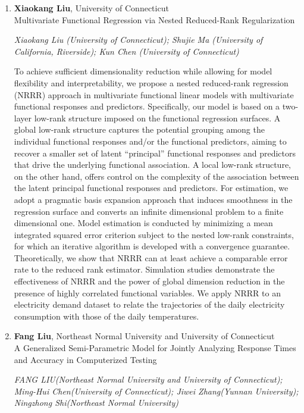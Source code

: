 \begin{enumerate}
\item \textbf{Xiaokang Liu}, University of Connecticut \\
Multivariate Functional Regression via Nested Reduced-Rank Regularization

\emph{\footnotesize Xiaokang Liu (University of Connecticut); Shujie Ma (University of California, Riverside); Kun Chen (University of Connecticut)}

To achieve sufficient dimensionality reduction while allowing for model flexibility and interpretability, we propose a nested reduced-rank regression (NRRR) approach in multivariate functional linear models with multivariate functional responses and predictors. Specifically, our model is based on a two-layer low-rank structure imposed on the functional regression surfaces. A global low-rank structure captures the potential grouping among the individual functional responses and/or the functional predictors, aiming to recover a smaller set of latent “principal” functional responses and predictors that drive the underlying functional association. A local low-rank structure, on the other hand, offers control on the complexity of the association between the latent principal functional responses and predictors. For estimation, we adopt a pragmatic basis expansion approach that induces smoothness in the regression surface and converts an infinite dimensional problem to a finite dimensional one. Model estimation is conducted by minimizing a mean integrated squared error criterion subject to the nested low-rank constraints, for which an iterative algorithm is developed with a convergence guarantee. Theoretically, we show that NRRR can at least achieve a comparable error rate to the reduced rank estimator. Simulation studies demonstrate the effectiveness of NRRR and the power of global dimension reduction in the presence of highly correlated functional variables. We apply NRRR to an electricity demand dataset to relate the trajectories of the daily electricity consumption with those of the daily temperatures.

\item \textbf{Fang Liu}, Northeast Normal University and University of Connecticut \\
A Generalized Semi-Parametric Model for Jointly Analyzing Response Times and Accuracy in Computerized Testing

\emph{\footnotesize FANG LIU(Northeast Normal University and University of Connecticut); Ming-Hui Chen(University of Connecticut); Jiwei Zhang(Yunnan University); Ningzhong Shi(Northeast Normal University)}


\end{enumerate}
